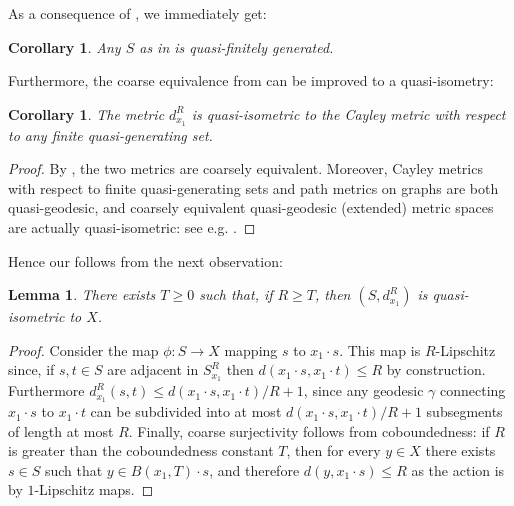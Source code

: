 \documentclass[svgnames]{amsart}
\theoremstyle{plain}
\newtheorem{lem}[thm]{Lemma}
\newtheorem{cor}[thm]{Corollary}
\theoremstyle{definition}
\begin{document}
\noindent As a consequence of , we immediately get:
\begin{cor}
    Any $S$ as in  is quasi-finitely generated.
\end{cor}

\noindent Furthermore, the coarse equivalence from  can be improved to a quasi-isometry:
\begin{cor}
    The metric $d^R_{x_1}$ is quasi-isometric to the Cayley metric with respect to any finite quasi-generating set.
\end{cor}

\begin{proof}
    By , the two metrics are coarsely equivalent. Moreover, Cayley metrics with respect to finite quasi-generating sets and path metrics on graphs are both quasi-geodesic, and coarsely equivalent quasi-geodesic (extended) metric spaces are actually quasi-isometric: see e.g. \cite[Section 0.2.D]{gromov_asymp_inv}.
\end{proof}

\noindent Hence our  follows from the next observation:

\begin{lem}\label{lem:dR_qi_X}
     There exists $T\ge 0$ such that, if $R\ge T$, then $(S,d^R_{x_1})$ is quasi-isometric to $X$.
\end{lem}

\begin{proof}
Consider the map $\phi\colon S\to X$ mapping $s$ to $x_1\cdot s$. This map is $R$-Lipschitz since, if $s,t\in S$ are adjacent in $S^R_{x_1}$ then $d(x_1\cdot s, x_1\cdot t)\le R$ by construction. Furthermore $d^R_{x_1}(s,t)\le d(x_1\cdot s, x_1\cdot t)/R+1$, since any geodesic $\gamma$ connecting $x_1\cdot s$ to $x_1\cdot t$ can be subdivided into at most $d(x_1\cdot s, x_1\cdot t)/R+1$ subsegments of length at most $R$. Finally, coarse surjectivity follows from coboundedness: if $R$ is greater than the coboundedness constant $T$, then for every $y\in X$ there exists $s\in S$ such that $y\in B(x_1,T)\cdot s$, and therefore $d(y,x_1\cdot s)\le R$ as the action is by $1$-Lipschitz maps. 
\end{proof}






\end{document}
